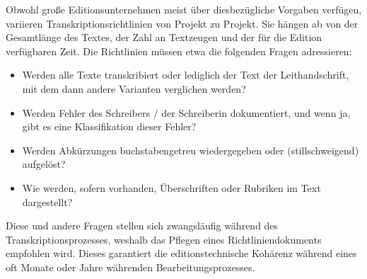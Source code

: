 \documentclass{article}
\begin{document}
        Obwohl große Editionsunternehmen meist über diesbezügliche Vorgaben verfügen,
                  variieren Transkriptionsrichtlinien von Projekt zu Projekt. Sie hängen ab von der
                  Gesamtlänge des Textes, der Zahl an Textzeugen und der für die Edition verfügbaren
                  Zeit. Die Richtlinien müssen etwa die folgenden Fragen adressieren: \\
            
        \begin{itemize}\item {Werden alle Texte transkribiert oder lediglich der Text der Leithandschrift,
                     mit dem dann andere Varianten verglichen werden? }\item {Werden Fehler des Schreibers / der Schreiberin dokumentiert, und wenn ja,
                     gibt es eine Klassifikation dieser Fehler? }\item {Werden Abkürzungen buchstabengetreu wiedergegeben oder (stillschweigend)
                     aufgelöst? }\item {Wie werden, sofern vorhanden, Überschriften oder Rubriken im Text
                     dargestellt?}\end{itemize}Diese und andere Fragen stellen sich zwangsläufig während des
                  Transkriptionsprozesses, weshalb das Pflegen eines Richtliniendokuments empfohlen
                  wird. Dieses garantiert die editionstechnische Kohärenz während eines oft Monate
                  oder Jahre währenden Bearbeitungsprozesses. \\
            
\end{document}
